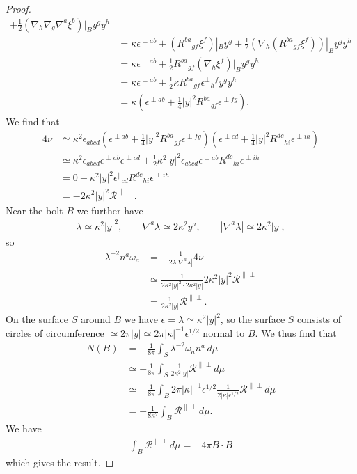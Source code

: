 \documentclass[a4paper,11pt,reqno]{amsart}
\newcommand{\bolt}{B}
\newcommand{\cR}{\mathcal{R}}
\theoremstyle{plain}
\numberwithin{equation}{section}
\newcommand{\eps}{\epsilon}
\begin{document}
\begin{proof}
\begin{align}
+ \frac{1}{2} (\nabla_h \nabla_g \nabla^a \xi^b)|_\bolt y^g y^h \\
&=
\kappa \eps^{\perp ab} + (R^{ba}{}_{gf} \xi^f)|_\bolt y^g
+ \frac{1}{2} (\nabla_h (R^{ba}{}_{gf} \xi^f))|_\bolt y^g y^h \\
&= \kappa \eps^{\perp ab} +
\frac{1}{2}R^{ba}{}_{gf} (\nabla_h \xi^f)|_\bolt y^g y^h \\
&=
\kappa \eps^{\perp ab} +
\frac{1}{2}\kappa R^{ba}{}_{gf} \eps^{\perp}{}_h{}^f y^g y^h \\
&=
\kappa \left(
\eps^{\perp ab} + \frac{1}{4}|y|^2 R^{ba}{}_{gf}\eps^{\perp fg} 
\right).
\end{align}
We find that 
\begin{align}
4\nu 
&\simeq
\kappa^2 \eps_{abcd}
\left(
\eps^{\perp ab} + \frac{1}{4}|y|^2 R^{ba}{}_{gf}\eps^{\perp fg} 
\right)
\left(
\eps^{\perp cd} + \frac{1}{4}|y|^2 R^{dc}{}_{hi}\eps^{\perp ih} 
\right) \\
&\simeq
\kappa^2 \eps_{abcd} \eps^{\perp ab} \eps^{\perp cd} 
+ \frac{1}{2}\kappa^2 |y|^2 \eps_{abcd} \eps^{\perp ab}
R^{dc}{}_{hi} \eps^{\perp ih} \\
&=
0 + 
\kappa^2 |y|^2 \eps^{\parallel}{}_{cd} R^{dc}{}_{hi} \eps^{\perp ih} \\
&=
- 2 \kappa^2 |y|^2 \cR^{\parallel\perp}. \label{eq:Rparper}
\end{align}
Near the bolt $\bolt$ we further have 
\begin{align}
\lambda \simeq \kappa^2 |y|^2, \qquad
\nabla^a \lambda \simeq 2 \kappa^2 y^a, \qquad 
|\nabla^a \lambda| \simeq 2 \kappa^2 |y|,
\end{align}
so
\begin{align}
\lambda^{-2} n^a \omega_a 
&= - \frac{1}{2\lambda|\nabla^a \lambda| } 4 \nu \\
&\simeq
\frac{1}{2 \kappa^2 |y|^2 \cdot 2 \kappa^2 |y|} 2 \kappa^2 |y|^2 \cR^{\parallel\perp} \\
&=
\frac{1}{2\kappa^2|y|}\cR^{\parallel\perp}. 
\end{align}
On the surface $S$ around $\bolt$ we have $\eps = \lambda \simeq \kappa^2 |y|^2$, so the surface $S$ consists of circles of circumference $\simeq 2\pi |y| \simeq 2\pi |\kappa|^{-1}\eps^{1/2}$ normal to $\bolt$. We thus find that
\begin{align}
N(\bolt) 
&= -\frac{1}{8\pi} \int_S \lambda^{-2} \omega_a n^a \, d\mu \\
&\simeq
- \frac{1}{8\pi} 
\int_S \frac{1}{2\kappa^2|y|}\cR^{\parallel\perp} d\mu \\
&\simeq
- \frac{1}{8\pi} 
\int_\bolt 2\pi |\kappa|^{-1}\eps^{1/2}
\frac{1}{2|\kappa| \eps^{1/2}}\cR^{\parallel\perp} d\mu \\
&=
- \frac{1}{8 \kappa^2} 
\int_\bolt \cR^{\parallel\perp} d\mu.
\end{align}
We have  
\begin{align}
\int_\bolt\mathcal{R}^{\parallel\perp}d\mu={}& 4\pi \bolt\!\cdot\! \bolt  
\end{align} 
which gives the result. 
\end{proof}
\end{document}
